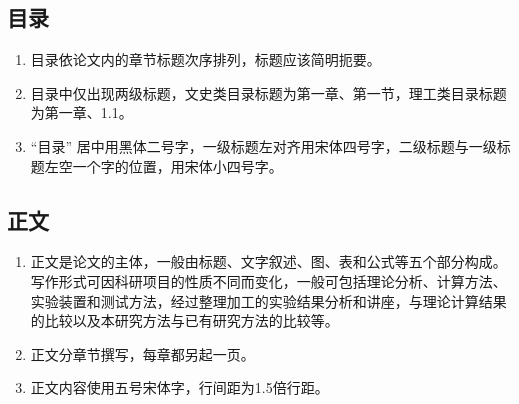 \subsection{目录}

\begin{enumerate}[label=\arabic*)]
	\item 目录依论文内的章节标题次序排列，标题应该简明扼要。
	
	\item 目录中仅出现两级标题，文史类目录标题为第一章、第一节，理工类目录标题为第一章、1.1。
	
	\item “目录” 居中用黑体二号字，一级标题左对齐用宋体四号字，二级标题与一级标题左空一个字的位置，用宋体小四号字。

\end{enumerate}

\subsection{正文}

\begin{enumerate}[label=\arabic*)]
	\item 正文是论文的主体，一般由标题、文字叙述、图、表和公式等五个部分构成。写作形式可因科研项目的性质不同而变化，一般可包括理论分析、计算方法、实验装置和测试方法，经过整理加工的实验结果分析和讲座，与理论计算结果的比较以及本研究方法与已有研究方法的比较等。
	
	\item 正文分章节撰写，每章都另起一页。
	
	\item 正文内容使用五号宋体字，行间距为1.5倍行距。
	
\end{enumerate}

